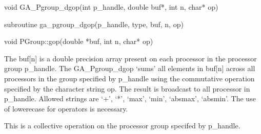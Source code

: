 \documentclass[12pt]{article}
\begin{document}

\begin{capi}
\begin{ccode}
void GA_Pgroup_dgop(int p_handle, double buf*, int n, char* op)
\end{ccode}
\begin{funcargs}
\end{funcargs}
\end{capi}

\begin{fapi}
\begin{fcode}
subroutine ga_pgroup_dgop(p_handle, type, buf, n, op)
\end{fcode}
\begin{funcargs}
\end{funcargs}
\end{fapi}

\begin{cxxapi}
\begin{cxxcode}
void PGroup::gop(double *buf, int n, char* op)
\end{cxxcode}
\begin{funcargs}
\end{funcargs}
\end{cxxapi}

\begin{desc}

The buf[n] is a double precision array present on each processor in the processor group p_handle. The GA_Pgroup_dgop `sums' all elements in buf[n] across all processors in the group specified by p_handle using the commutative operation specified by the character string op.  The result is broadcast to all processor in p_handle. Allowed strings are `+', `*', `max', `min', `absmax', `absmin'. The use of lowerecase for operators is necessary.

This is a collective operation on the processor group specifed by p_handle. 
\end{desc}
\end{document}
